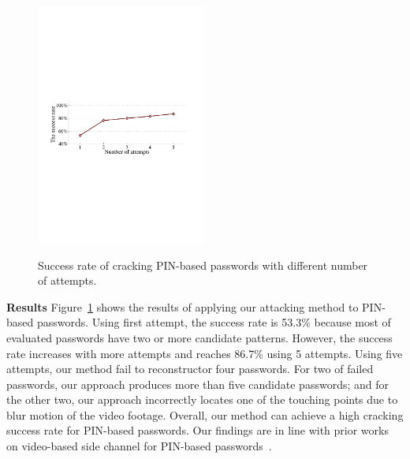     \begin{figure}[!t]
        \centering
        \includegraphics[width=0.5\textwidth]{fig/pin_results}\\
        \caption{Success rate of cracking PIN-based passwords with different number of attempts.}
        \label{fig:pin_results}
    \end{figure}

        \noindent \textbf{Results} Figure~\ref{fig:pin_results} shows the
        results of applying our attacking method to PIN-based passwords.
        Using first attempt, the success rate is  53.3\% because most of
        evaluated passwords have two or more candidate patterns. However, the
        success rate increases with more attempts and reaches 86.7\% using 5
        attempts. Using five attempts, our method fail to reconstructor four
        passwords. For two of failed passwords, our approach produces more
        than five candidate passwords; and for the other two, our approach
        incorrectly locates one of the touching points due to  blur
        motion of the video footage. Overall, our method can achieve a high
        cracking success rate for PIN-based passwords. Our findings are in
        line with prior works on video-based side channel for PIN-based
        passwords~\cite{shukla2014beware}.

%


